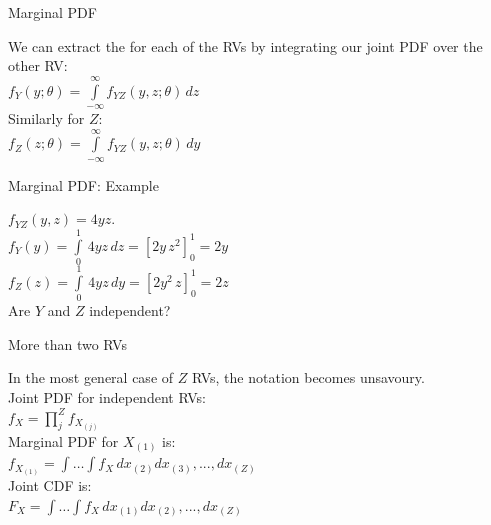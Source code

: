 \documentclass[10pt,sans,english,compress,table,xcolor=dvipsnames]{beamer}
\begin{document}
\begin{frame}{Marginal PDF}

We can extract the  for each of the RVs by integrating our joint PDF over the other RV:\\[1ex]

 $f_Y(y;\theta) = \int \limits_{-\infty}^{\infty}  f_{YZ}(y,z;\theta) \, dz$\\[1ex]
 
 Similarly for $Z$:\\[1ex]
 
  $f_Z(z;\theta) = \int \limits_{-\infty}^{\infty}  f_{YZ}(y,z;\theta) \, dy$\\[1ex]

\end{frame}


\begin{frame}{Marginal PDF: Example}

 $f_{YZ}(y,z) = 4yz$.\\[1ex]

$
f_Y(y) = \int \limits_{0}^{1} \,4yz\,  dz = 
\left[ 2y\,z^2\right]_{0}^{1} =2y 
$\\

$
f_Z(z) = \int \limits_{0}^{1} \,4yz\,  dy = 
\left[ 2y^2\,z\right]_{0}^{1} =2z 
$\\[2ex]

Are $Y$ and $Z$ independent?\\

\end{frame}





\begin{frame}{More than two RVs}

In the most general case of $Z$ RVs, the notation becomes unsavoury.\\[1ex]

Joint PDF for independent RVs:\\[1ex]
$ f_{X} = \prod\limits_j^Z f_{X_{(j)}} $\\[1ex]

Marginal PDF for $X_{(1)}$ is:\\[1ex]
$f_{X_{(1)}} = \int \dots \int f_{X} \,dx_{(2)} dx_{(3)} ,..., dx_{(Z)} $\\[1ex]


Joint CDF is:\\[1ex]
$F_{X} = \int \dots \int f_X \,dx_{(1)} dx_{(2)} ,..., dx_{(Z)} $\\[1ex]
%  
%  
% 

% 
\end{frame}
\end{document}
